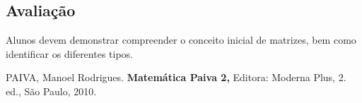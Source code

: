 \documentclass[oneside,a4paper,12pt]{article}
\begin{document}
  \begin{snugshade}
  \section{Avaliação} %
  \end{snugshade}

  Alunos devem demonstrar compreender o conceito inicial de matrizes, bem como identificar os diferentes tipos.




\begin{thebibliography}{}

PAIVA, Manoel Rodrigues.
\newblock \textbf{Matemática Paiva 2,}
\newblock Editora: Moderna Plus, 2. ed., São Paulo, 2010.

\end{thebibliography}
\end{document}
